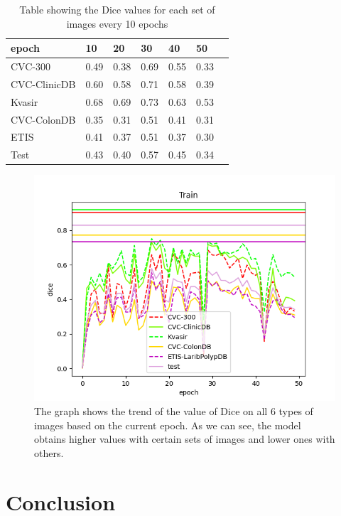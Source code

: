 \documentclass[
	a4paper, %
	10pt, %
	unnumberedsections, %
	twoside, %
]{LTJournalArticle}
\begin{document}
\begin{table} %
	\caption{Table showing the Dice values for each set of images every 10 epochs}
	\centering
	\begin{tabular}{l l l l l l l}
		\toprule
		epoch & 10 & 20 & 30 & 40 & 50 \\
		\midrule
		CVC-300 & 0.49 & 0.38 & 0.69 & 0.55 & 0.33\\
		CVC-ClinicDB & 0.60 & 0.58 & 0.71 & 0.58 & 0.39\\
		Kvasir & 0.68 & 0.69 & 0.73 & 0.63 & 0.53\\
        CVC-ColonDB & 0.35 & 0.31 & 0.51 & 0.41 & 0.31\\
        ETIS & 0.41 & 0.37 & 0.51 & 0.37 & 0.30\\
        Test & 0.43 & 0.40 & 0.57 & 0.45 & 0.34\\
		\bottomrule
	\end{tabular}
	\label{tab:tab1}
\end{table}

\begin{figure} %
	\includegraphics[width=\linewidth]{Figures/50-plot.png}
	\caption{The graph shows the trend of the value of Dice on all 6 types of images based on the current epoch. As we can see, the model obtains higher values with certain sets of images and lower ones with others.}
	\label{fig:fig1}
\end{figure}


\section{Conclusion}
\end{document}
